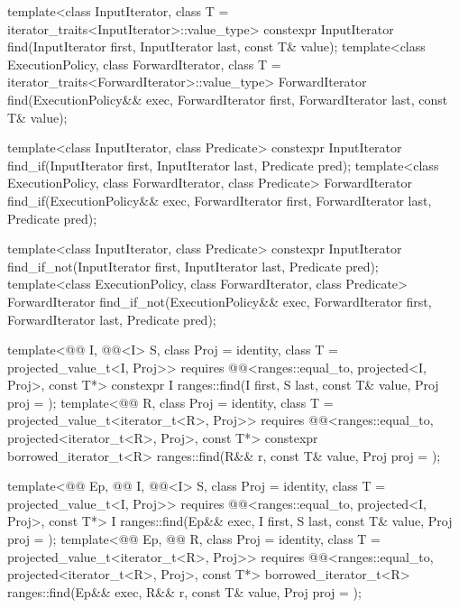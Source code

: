 %
%
%
\begin{itemdecl}
template<class InputIterator, class T = iterator_traits<InputIterator>::value_type>
  constexpr InputIterator find(InputIterator first, InputIterator last,
                               const T& value);
template<class ExecutionPolicy, class ForwardIterator,
         class T = iterator_traits<ForwardIterator>::value_type>
  ForwardIterator find(ExecutionPolicy&& exec, ForwardIterator first, ForwardIterator last,
                       const T& value);

template<class InputIterator, class Predicate>
  constexpr InputIterator find_if(InputIterator first, InputIterator last,
                                  Predicate pred);
template<class ExecutionPolicy, class ForwardIterator, class Predicate>
  ForwardIterator find_if(ExecutionPolicy&& exec, ForwardIterator first, ForwardIterator last,
                          Predicate pred);

template<class InputIterator, class Predicate>
  constexpr InputIterator find_if_not(InputIterator first, InputIterator last,
                                      Predicate pred);
template<class ExecutionPolicy, class ForwardIterator, class Predicate>
  ForwardIterator find_if_not(ExecutionPolicy&& exec,
                              ForwardIterator first, ForwardIterator last,
                              Predicate pred);

template<@@ I, @@<I> S, class Proj = identity,
         class T = projected_value_t<I, Proj>>
  requires @@<ranges::equal_to, projected<I, Proj>, const T*>
  constexpr I ranges::find(I first, S last, const T& value, Proj proj = {});
template<@@ R, class Proj = identity, class T = projected_value_t<iterator_t<R>, Proj>>
  requires @@<ranges::equal_to, projected<iterator_t<R>, Proj>, const T*>
  constexpr borrowed_iterator_t<R>
    ranges::find(R&& r, const T& value, Proj proj = {});

template<@@ Ep, @@ I, @@<I> S,
         class Proj = identity, class T = projected_value_t<I, Proj>>
  requires @@<ranges::equal_to, projected<I, Proj>, const T*>
  I ranges::find(Ep&& exec, I first, S last, const T& value, Proj proj = {});
template<@@ Ep, @@ R, class Proj = identity,
         class T = projected_value_t<iterator_t<R>, Proj>>
  requires @@<ranges::equal_to,
                                     projected<iterator_t<R>, Proj>, const T*>
  borrowed_iterator_t<R> ranges::find(Ep&& exec, R&& r, const T& value, Proj proj = {});


\end{itemdecl}
